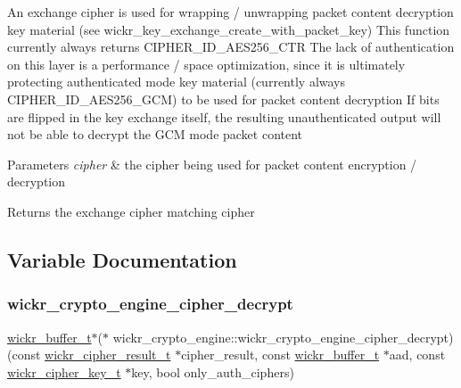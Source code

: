 An exchange cipher is used for wrapping / unwrapping packet content decryption key material (see wickr\+\_\+key\+\_\+exchange\+\_\+create\+\_\+with\+\_\+packet\+\_\+key) This function currently always returns C\+I\+P\+H\+E\+R\+\_\+\+I\+D\+\_\+\+A\+E\+S256\+\_\+\+C\+TR The lack of authentication on this layer is a performance / space optimization, since it is ultimately protecting authenticated mode key material (currently always C\+I\+P\+H\+E\+R\+\_\+\+I\+D\+\_\+\+A\+E\+S256\+\_\+\+G\+CM) to be used for packet content decryption If bits are flipped in the key exchange itself, the resulting unauthenticated output will not be able to decrypt the G\+CM mode packet content


\begin{DoxyParams}{Parameters}
{\em cipher} & the cipher being used for packet content encryption / decryption \\
\hline
\end{DoxyParams}
\begin{DoxyReturn}{Returns}
the exchange cipher matching \textquotesingle{}cipher\textquotesingle{} 
\end{DoxyReturn}


\subsection{Variable Documentation}
\mbox{\label{group__wickr__crypto__engine_ga459ef821cc40edb5e3c9ce1d571ddc00}} 
\subsubsection{\texorpdfstring{wickr\+\_\+crypto\+\_\+engine\+\_\+cipher\+\_\+decrypt}{wickr\_crypto\_engine\_cipher\_decrypt}}
{\footnotesize\ttfamily \mbox{\hyperlink{structwickr__buffer}{wickr\+\_\+buffer\+\_\+t}}$\ast$($\ast$ wickr\+\_\+crypto\+\_\+engine\+::wickr\+\_\+crypto\+\_\+engine\+\_\+cipher\+\_\+decrypt) (const \mbox{\hyperlink{structwickr__cipher__result}{wickr\+\_\+cipher\+\_\+result\+\_\+t}} $\ast$cipher\+\_\+result, const \mbox{\hyperlink{structwickr__buffer}{wickr\+\_\+buffer\+\_\+t}} $\ast$aad, const \mbox{\hyperlink{structwickr__cipher__key}{wickr\+\_\+cipher\+\_\+key\+\_\+t}} $\ast$key, bool only\+\_\+auth\+\_\+ciphers)}

